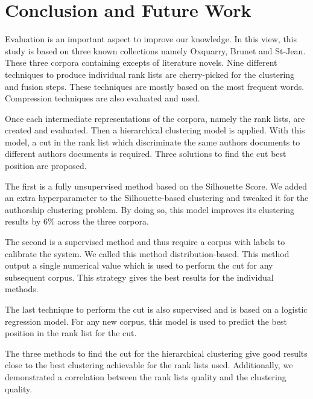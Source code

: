 \chapter{Conclusion and Future Work\label{sec:conclusion}}


Evaluation is an important aspect to improve our knowledge.
In this view, this study is based on three known collections namely Oxquarry, Brunet and St-Jean.
These three corpora containing excepts of literature novels.
Nine different techniques to produce individual rank lists are cherry-picked for the clustering and fusion steps.
These techniques are mostly based on the most frequent words.
Compression techniques are also evaluated and used.

Once each intermediate representations of the corpora, namely the rank lists, are created and evaluated.
Then a hierarchical clustering model is applied.
With this model, a cut in the rank list which discriminate the same authors documents to different authors documents is required.
Three solutions to find the cut best position are proposed.

The first is a fully unsupervised method based on the Silhouette Score.
We added an extra hyperparameter to the Silhouette-based clustering and tweaked it for the authorship clustering problem.
By doing so, this model improves its clustering results by 6\% across the three corpora.

The second is a supervised method and thus require a corpus with labels to calibrate the system.
We called this method distribution-based.
This method output a single numerical value which is used to perform the cut for any subsequent corpus.
This strategy gives the best results for the individual methods.

The last technique to perform the cut is also supervised and is based on a logistic regression model.
For any new corpus, this model is used to predict the best position in the rank list for the cut.

The three methods to find the cut for the hierarchical clustering give good results close to the best clustering achievable for the rank lists used.
Additionally, we demonstrated a correlation between the rank lists quality and the clustering quality.

